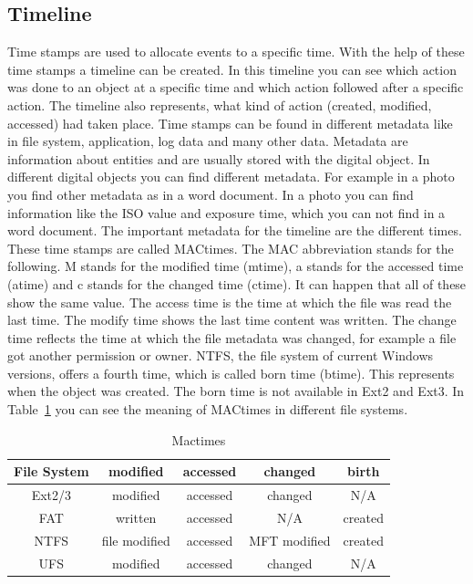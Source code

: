 
\subsection{Timeline}

Time stamps are used to allocate events to a specific time.
With the help of these time stamps a timeline can be created. 
In this timeline you can see which action was done to an object at a specific time and which action followed after a specific action. 
The timeline also  represents, what kind of action (created, modified, accessed) had taken place. 
Time stamps can be found in different metadata like in file system, application, log data and many other data. 
Metadata are information about entities and are usually stored with the digital object. 
In different digital objects you can find different metadata. 
For example in a photo you find other metadata as in a word document. 
In a photo you can find information like the ISO value and exposure time, which you can not find in a word document. 
The important metadata for the timeline are the different times. 
These time stamps are called MACtimes. 
The MAC abbreviation stands for the following. 
M stands for the modified time (mtime), a  stands for the accessed time (atime) and c stands for the changed time (ctime). 
It can happen that all of these show the same value. 
The access time is the time at which the file was read the last time. 
The modify time shows the last time content was written.
The change time reflects the time at which the file metadata was changed, for example a file got another permission or owner. 
NTFS, the file system of current Windows versions, offers a fourth time, which is called born time (btime). 
This represents when the object was created.
The born time is not available in Ext2 and Ext3. 
In Table~\ref{fig:Mactimes} you can see the meaning of MACtimes in different file systems. 

\begin{table}[h]

\begin{tabular}{c|c|c|c|c}
	File System & modified & accessed & changed & birth \\
	\hline \hline
	Ext2/3 & modified & accessed & changed & N/A \\
	\hline
	FAT & written & accessed & N/A & created \\
	\hline
	NTFS & file modified & accessed & MFT modified & created \\
	\hline
	UFS & modified & accessed & changed & N/A \\

\end{tabular}

\caption{Mactimes}
\label{fig:Mactimes}
\end{table}

